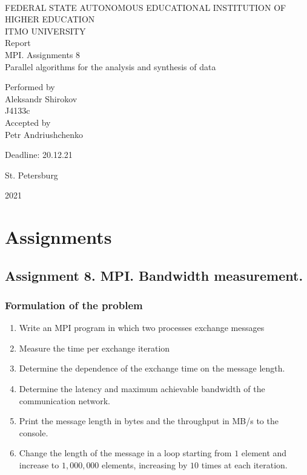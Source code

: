 \documentclass[%
12pt, %
final, %
oneside, %
onecolumn, %
centertags]{article} %
\theoremstyle{plain}
\theoremstyle{definition}
\theoremstyle{remark}
\begin{document}
	\begin{titlepage} 
		\begin{center}
		\textbf{}\\[2.0cm]
		\LARGE FEDERAL STATE AUTONOMOUS EDUCATIONAL INSTITUTION OF HIGHER EDUCATION \\[0.5cm]
		\Large ITMO UNIVERSITY \\[3cm]
		\LARGE Report\\
		\Large MPI. Assignments $8$ \\
		\Large Parallel algorithms for the analysis and synthesis of data \\[4cm]


		\begin{flushright}
		Performed by\\
		Aleksandr Shirokov\\
		J4133c\\
		Accepted by\\
		Petr Andriushchenko

		Deadline: 20.12.21
		\end{flushright}

		\vfill 

		{\Large {St. Petersburg}} \par
		{\Large {2021}}
		\end{center} 
	\end{titlepage}

\tableofcontents
\newpage


\section{Assignments}

\subsection{Assignment 8. MPI.  Bandwidth measurement.}

\subsubsection{Formulation of the problem}

\begin{enumerate}
	\item Write an MPI program in which two processes exchange messages
	\item Measure the time 
per exchange iteration
	\item Determine the dependence of the exchange time on the 
message length.
	\item Determine the latency and maximum achievable bandwidth of the 
communication network.
	\item Print the message length in bytes and the throughput in 
MB/s to the console.
	\item Change the length of the message in a loop starting from $1$ element and increase to $1,000,000$ elements, increasing by $10$ times at each iteration.
\end{enumerate}
\end{document}
